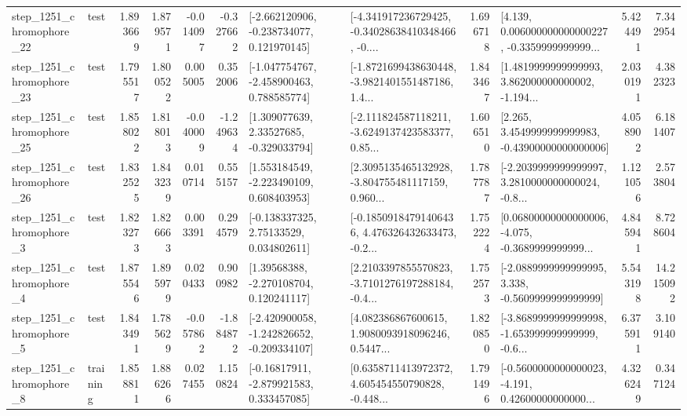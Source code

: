 \begin{tabular}{llrrrrllrlrr}
 step\_1251\_chromophore\_22 &      test &      1.893669 &    1.879571 &     -0.014097 & -0.327662 &   [-2.662120906, -0.238734077, 0.121970145] &  [-4.341917236729425, -0.34028638410348466, -0.... &       1.696718 &  [4.139, 0.006000000000000227, -0.3359999999999... &            5.424491 &          7.342954 \\
 step\_1251\_chromophore\_23 &      test &      1.795517 &    1.800522 &      0.005005 &  0.352006 &   [-1.047754767, -2.458900463, 0.788585774] &  [-1.8721699438630448, -3.9821401551487186, 1.4... &       1.843467 &  [1.4819999999999993, 3.862000000000002, -1.194... &            2.030191 &          4.382323 \\
 step\_1251\_chromophore\_25 &      test &      1.858022 &    1.818013 &     -0.040009 & -1.249634 &     [1.309077639, 2.33527685, -0.329033794] &  [-2.111824587118211, -3.6249137423583377, 0.85... &       1.606510 &  [2.265, 3.4549999999999983, -0.43900000000000006] &            4.058902 &          6.181407 \\
 step\_1251\_chromophore\_26 &      test &      1.832525 &    1.843239 &      0.010714 &  0.555157 &    [1.553184549, -2.223490109, 0.608403953] &  [2.3095135465132928, -3.804755481117159, 0.960... &       1.787787 &  [-2.2039999999999997, 3.2810000000000024, -0.8... &            1.121056 &          2.573804 \\
  step\_1251\_chromophore\_3 &      test &      1.823273 &    1.826663 &      0.003391 &  0.294579 &     [-0.138337325, 2.75133529, 0.034802611] &  [-0.18509184791406436, 4.476326432633473, -0.2... &       1.752224 &  [0.06800000000000006, -4.075, -0.3689999999999... &            4.845941 &          8.728604 \\
  step\_1251\_chromophore\_4 &      test &      1.875546 &    1.895979 &      0.020433 &  0.900982 &     [1.39568388, -2.270108704, 0.120241117] &  [2.2103397855570823, -3.7101276197288184, -0.4... &       1.752573 &  [-2.0889999999999995, 3.338, -0.5609999999999999] &            5.543198 &         14.215092 \\
  step\_1251\_chromophore\_5 &      test &      1.843491 &    1.785629 &     -0.057862 & -1.884872 &  [-2.420900058, -1.242826652, -0.209334107] &  [4.082386867600615, 1.9080093918096246, 0.5447... &       1.820850 &  [-3.8689999999999998, -1.653999999999999, -0.6... &            6.375911 &          3.109140 \\
  step\_1251\_chromophore\_8 &  training &      1.858811 &    1.886266 &      0.027455 &  1.150824 &    [-0.16817911, -2.879921583, 0.333457085] &  [0.6358711413972372, 4.605454550790828, -0.448... &       1.791496 &  [-0.5600000000000023, -4.191, 0.42600000000000... &            4.326249 &          0.347124 \\

\end{tabular}
